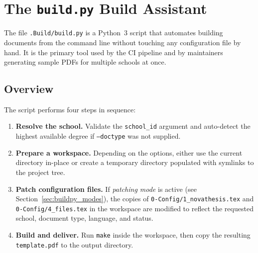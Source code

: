 

%

\chapter{The \texttt{build.py} Build Assistant}
\label{cha:build_py}

The file \verb!.Build/build.py! is a Python~3 script that automates building
\novathesis{} documents from the command line without touching any
configuration file by hand.  It is the primary tool used by the
CI pipeline and by maintainers generating sample PDFs for multiple
schools at once.


\section{Overview}
\label{sec:buildpy_overview}

The script performs four steps in sequence:

\begin{enumerate}
  \item \textbf{Resolve the school.}  Validate the \texttt{school\_id}
        argument and auto-detect the highest available degree if
        \texttt{--doctype} was not supplied.
  \item \textbf{Prepare a workspace.}  Depending on the options, either
        use the current directory in-place or create a temporary directory
        populated with symlinks to the project tree.
  \item \textbf{Patch configuration files.}  If \emph{patching mode} is
        active (see Section~\ref{sec:buildpy_modes}), the copies of
        \verb!0-Config/1_novathesis.tex! and \verb!0-Config/4_files.tex!
        in the workspace are modified to reflect the requested school,
        document type, language, and status.
  \item \textbf{Build and deliver.}  Run \texttt{make} inside the workspace,
        then copy the resulting \verb!template.pdf! to the output directory.
\end{enumerate}

